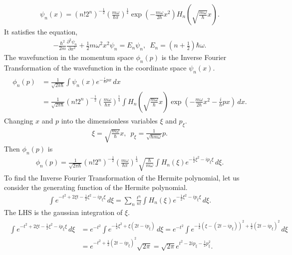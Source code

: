 \documentclass[floatfix,nofootinbib,superscriptaddress,fleqn]{revtex4-2}
\begin{document}
 \begin{align}\label{eq:5-1}
   \psi_n(x)=(n!2^n)^{-\frac{1}{2}}
   \left(\frac{m\omega}{\hbar\pi}\right)^{\frac{1}{4}}
   \exp\left(-\frac{m\omega}{2\hbar}x^2\right)
   H_n\left(\sqrt{\frac{m\omega}{\hbar}}x\right).
 \end{align}
 It satisfies the equation,
\begin{align}\label{eq:5-2}
  -\frac{\hbar^2}{2m}\frac{\partial^2\psi_n}{\partial x^2}
  +\frac{1}{2}m\omega^2x^2\psi_n = E_n\psi_n,\,\,\,
  E_n = \left(n+\frac{1}{2}\right)\hbar\omega.
\end{align}
The wavefunction in the momentum space $\phi_n(p)$ 
is the Inverse Fourier Transformation 
of the wavefunction in the coordinate space $\psi_n(x)$.
\begin{align}
  \begin{split}
    \phi_n(p) &= \frac{1}{\sqrt{2\pi\hbar}}
    \int \psi_n(x) e^{-\frac{i}{\hbar} px} \, dx \\
    &= \frac{1}{\sqrt{2\pi\hbar}}(n!2^n)^{-\frac{1}{2}}
    \left(\frac{m\omega}{\hbar\pi}\right)^{\frac{1}{4}}
    \int H_n\left(\sqrt{\frac{m\omega}{\hbar}}x\right)
    \exp{\left( -\frac{m\omega}{2\hbar}x^2
    -\frac{i}{\hbar} px \right)}\, dx.
  \end{split}
\end{align}
Changing $x$ and $p$ into the dimensionless variables 
$\xi$ and $p_{\xi}$.
\begin{align}
  \xi = \sqrt{\frac{m\omega }{\hbar }}x,\,\,\,
  p_\xi = \frac{1}{\sqrt{\hbar m \omega}}p.
\end{align}
Then $\phi_n(p)$ is
\begin{align}
  \phi_n(p) = \frac{1}{\sqrt{2\pi\hbar}}(n!2^n)^{-\frac{1}{2}}
  \left(\frac{m\omega}{\hbar\pi}\right)^{\frac{1}{4}}
  \sqrt{\frac{\hbar }{m\omega }}
  \int H_n\left( \xi \right)
  e^{-\frac{1}{2}\xi^2 -i p_\xi\xi }\, d\xi.
\end{align}
To find the Inverse Fourier Transformation of the Hermite polynomial,
let us consider the generating function of the Hermite polynomial.
\begin{align}\label{eq:5-3}
  \int e^{-t^2 +2\xi t-\frac{1}{2}\xi^2 -i p_\xi\xi } \,d\xi
  =\sum_n \frac{t^n}{n!}\int H_n(\xi)
  e^{-\frac{1}{2}\xi^2 -i p_\xi\xi }\, d\xi.
\end{align}
The LHS is the gaussian integration of $\xi$.
\begin{align}
  \begin{split}
    \int e^{-t^2 +2\xi t-\frac{1}{2}\xi^2 -i p_\xi\xi } \,d\xi
    &=e^{-t^2 }\int e^{-\frac{1}{2}\xi^2+\xi(2t -i p_\xi) } \,d\xi
    =e^{-t^2 }\int e^{-\frac{1}{2}(\xi-(2t -i p_\xi))^2
    +\frac{1}{2}(2t-ip_\xi)^2 } \,d\xi  \\
    &=e^{-t^2 +\frac{1}{2}(2t-ip_\xi)^2}\sqrt{2\pi}
    =\sqrt{2\pi}e^{t^2-2ip_\xi-\frac{1}{2}p^2_\xi}.
  \end{split}
\end{align}
\end{document}
